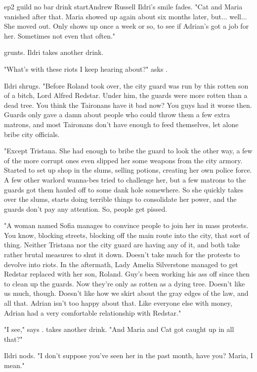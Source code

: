 \documentclass{book}
\begin{document}
\begin{childnode}{ep2 guild no bar drink start}{Andrew Russell}
    Ildri's smile fades. "Cat and Maria vanished after that. Maria showed up again about six months later, but... well... She moved out. Only shows up once a week or so, to see if Adrian's got a job 
    for her. Sometimes not even that often."

    \name{} grunts. Ildri takes another drink.

    "What's with these riots I keep hearing about?" asks \name{}.

    Ildri shrugs. "Before Roland took over, the city guard was run by this rotten son of a bitch, Lord Alfred Redstar. Under him, the guards were more rotten than a dead tree. You think the Taironans have it bad now? You guys had it worse then. Guards only gave a 
    damn about people who could throw them a few extra matrons, and most Taironans
    don't have enough to feed themselves, let alone bribe city officials. 
    
    "Except Tristana. She had enough to bribe the guard to look the other way, a few of the more corrupt ones even slipped her some weapons from the city armory. Started to set up shop in the
    slums, selling potions, creating her own police force. A few other warlord wanna-bes tried to challenge her, but a few matrons to the guards got them hauled off to some dank hole somewhere. So she quickly takes over the slums, starts doing terrible things to 
    consolidate her power, and the guards don't pay any attention. So, people get pissed.
    
    "A woman named Sofia manages to convince people to join her in mass protests. You know, blocking streets, blocking off the main route into the city, that sort of thing. Neither 
    Tristana nor the city guard are having any of it, and both take rather brutal measures to shut it down. Doesn't take much for the protests to devolve into riots. In the aftermath, Lady Amelia Silverstone managed to get Redstar replaced with her son, Roland.
    Guy's been working his ass off since then to clean up the guards. Now they're only as rotten as a dying tree. Doesn't like us much, though. Doesn't like how we skirt about the gray edges of the 
    law, and all that. Adrian isn't too happy about that. Like everyone else with money, Adrian had a very comfortable relationship with Redstar."

    "I see," says \name{}. \HeShe{} takes another drink. "And Maria and Cat got caught up in all that?"
   
    Ildri nods. "I don't suppose you've seen her in the past month, have you? Maria, I mean."


\end{childnode}
\end{document}
